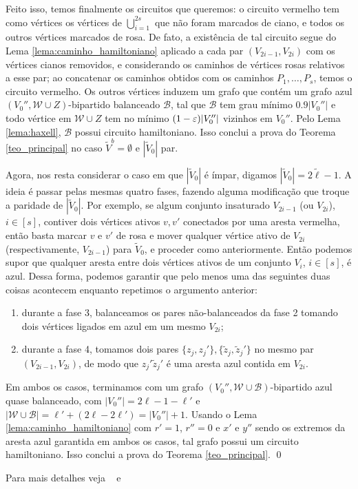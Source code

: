 Feito isso, temos finalmente os circuitos que queremos: o circuito vermelho tem como vértices os vértices de $\bigcup_{i=1}^{2s}$ que não foram marcados de ciano, e todos os outros vértices marcados de rosa. De fato, a existência de tal circuito segue do Lema \ref{lema:caminho_hamiltoniano} aplicado a cada par $(V_{2i-1},V_{2i})$ com os vértices cianos removidos, e considerando os caminhos de vértices rosas relativos a esse par; ao concatenar os caminhos obtidos com os caminhos $P_1,\dots,P_s$, temos o circuito vermelho. Os outros vértices induzem um grafo que contém um grafo azul $(V_0'', \mathcal{W}\cup Z)$-bipartido balanceado $\mathcal{B}$, tal que $\mathcal{B}$ tem grau mínimo $0.9|V_0''|$ e todo vértice em $\mathcal{W}\cup Z$ tem no mínimo $(1-\varepsilon)|V_0''|$ vizinhos em $V_0''$. Pelo Lema \ref{lema:haxell}, $\mathcal{B}$ possui circuito hamiltoniano. Isso conclui a prova do Teorema \ref{teo_principal} no caso $\tilde{V}^b=\emptyset$ e $|\tilde{V}_0|$ par. 

Agora, nos resta considerar o caso em que $|\tilde{V}_0|$ é ímpar, digamos $|\tilde{V}_0| = 2\tilde{\ell}-1$. A ideia é passar pelas mesmas quatro fases, fazendo alguma modificação que troque a paridade de $|\tilde{V}_0|$. Por exemplo, se algum conjunto insaturado $V_{2i-1}$ (ou $V_{2i}$), $i\in[s]$, contiver dois vértices ativos $v,v'$ conectados por uma aresta vermelha, então basta marcar $v$ e $v'$ de rosa e mover qualquer vértice ativo de $V_{2i}$ (respectivamente, $V_{2i-1}$) para $\tilde{V}_0$, e proceder como anteriormente. Então podemos supor que qualquer aresta entre dois vértices ativos de um conjunto $V_i$, $i\in[s]$, é azul. Dessa forma, podemos garantir que pelo menos uma das seguintes duas coisas acontecem enquanto repetimos o argumento anterior: 
\begin{enumerate}[(1)]
	\item durante a fase 3, balanceamos os pares não-balanceados da fase 2 tomando dois vértices ligados em azul em um mesmo $V_{2i}$;
	\item durante a fase 4, tomamos dois pares $\{z_j,z_j'\}, \{\tilde{z}_j,\tilde{z}_j'\}$ no mesmo par $(V_{2i-1},V_{2i})$, de modo que $z_j'\tilde{z}_j'$ é uma aresta azul contida em $V_{2i}$.
\end{enumerate}
Em ambos os casos, terminamos com um grafo $(V_0'', \mathcal{W}\cup\mathcal{B})$-bipartido azul quase balanceado, com $|V_0''| = 2\ell - 1 - \ell'$ e $|\mathcal{W}\cup\mathcal{B}| = \ell' + (2\ell - 2\ell') = |V_0''| + 1$. Usando o Lema \ref{lema:caminho_hamiltoniano} com $r'=1$, $r'' = 0$ e $x'$ e $y''$ sendo os extremos da aresta azul garantida em ambos os casos, tal grafo possui um circuito hamiltoniano.
Isso conclui a prova do Teorema \ref{teo_principal}.
\qed

Para mais detalhes veja ~\cite[p. nn]{Lvr} e ~\cite{Art}

